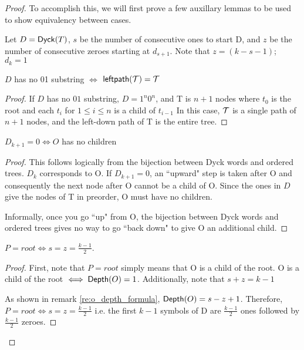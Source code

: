 \begin{proof}
To accomplish this, we will first prove a few auxillary lemmas to be used to show equivalency between cases. 

Let $D=\mathsf{Dyck}{(T)}$, $s$ be the number of consecutive ones to start D, and $z$ be the number of consecutive zeroes starting at $d_{s+1}$.  Note that $z=(k-s-1)$; $d_{k}=1$
\begin{lemma} \label{le:final_case_equivalence}

    $D$ has no 01 substring $\iff$ $\mathsf{leftpath}{(\mathcal{T})}=\mathcal{T}$
\end{lemma}
\begin{proof}


    If $D$ has no $01$ substring, $D=1^n0^n$, and T is $n+1$ nodes where $t_0$ is the root and each $t_i$ for $1\le i \le n$ is a child of $t_{i-1}$  In this case, $\mathcal{T}$ is a single path of $n+1$ nodes, and the left-down path of T is the entire tree.
\end{proof}
\begin{lemma} \label{le:no_children_equivalence}
    $D_{k+1} = 0 \iff O$ has no children
\end{lemma}
\begin{proof}

    This follows logically from the bijection between Dyck words and ordered trees.  $D_k$ corresponds to O.  If $D_{k+1}=0$, an ``upward" step is taken after O and consequently the next node after O cannot be a child of O.  Since the ones in $D$ give the nodes of T in preorder, O must have no children.

    Informally, once you go ``up" from O, the bijection between Dyck words and ordered trees gives no way to go ``back down" to give O an additional child.
\end{proof}
\begin{lemma} \label{le:tight_case_equivalence}
    $P=root \iff s=z=\frac{k-1}{2}$.
\end{lemma}
\begin{proof}

    First, note that $P=root$ simply means that O is a child of the root.  O is a child of the root $\iff \mathsf{Depth}{(O)}=1$.  Additionally, note that $s+z=k-1$

    As shown in remark \ref{re:o_depth_formula}, $\mathsf{Depth}{(O)}=s-z+1$. Therefore, $P=root \iff s=z=\frac{k-1}{2}$
    i.e. the first $k-1$ symbols of D are $\frac{k-1}{2}$ ones followed by $\frac{k-1}{2}$ zeroes. 



\end{proof}
\end{proof}
